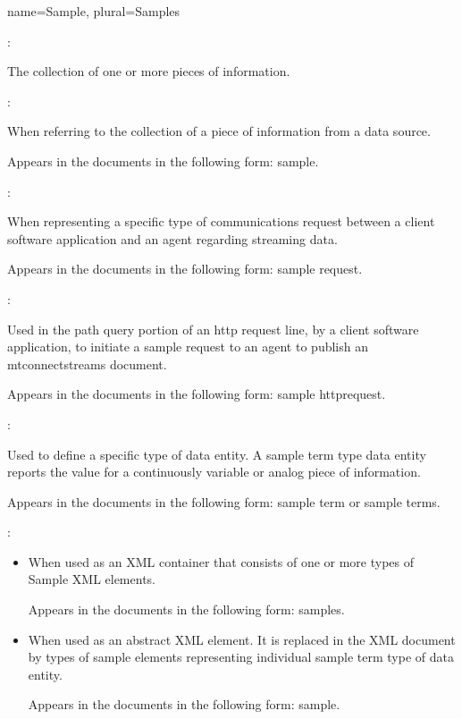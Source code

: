 {
  name={Sample},
  plural={Samples}
}
{
	:

	The collection of one or more pieces of information.  

	:

	When referring to the collection of a piece of information from a data source.

	Appears in the documents in the following form: sample.

	:

	When representing a specific type of communications request between a client software application and an \gls{agent} regarding \gls{streaming data}.  

	Appears in the documents in the following form: \gls{sample request}.

	:

	Used in the \gls{path query} portion of an \gls{http request line}, by a client software application, to initiate a \gls{sample request} to an \gls{agent} to publish an \glspl{mtconnectstream} document.

	Appears in the documents in the following form: \gls{sample httprequest}.

	:

	Used to define a specific type of \gls{data entity}.  A \gls{sample term} type \gls{data entity} reports the value for a continuously variable or analog piece of information.

	Appears in the documents in the following form: \gls{sample term} or \glspl{sample term}.

	:

    \begin{itemize}
	\item When used as an XML container that consists of one or more types of Sample XML elements.

	Appears in the documents in the following form: \gls{samples}.

	\item When used as an abstract XML element.  It is replaced in the XML document by types of \gls{sample} elements representing individual \gls{sample term} type of \gls{data entity}.

	Appears in the documents in the following form: \gls{sample}.
    \end{itemize}
}


